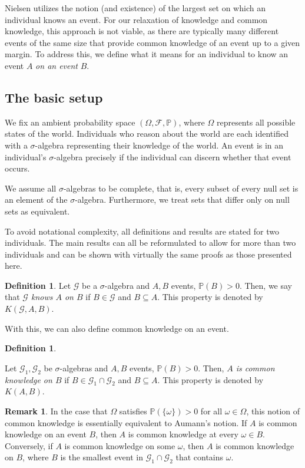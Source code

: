 \documentclass[a4paper, 10pt]{article}
\numberwithin{theorem}{section}
\theoremstyle{definition}
\newtheorem{definition}[theorem]{Definition}
\newtheorem{remark}[theorem]{Remark}
\newcommand{\F}{\mathcal{F}}
\newcommand{\G}{\mathcal{G}}
\renewcommand{\P}{\mathbb{P}}
\begin{document}
Nielsen utilizes the notion (and existence) of the largest set on which an individual knows an event. For our relaxation of knowledge and common knowledge, this approach is not viable, as there are typically many different events of the same size that provide common knowledge of an event up to a given margin. To address this, we define what it means for an individual to know an event $A$ \emph{on an event} $B$.

\subsection{The basic setup}

We fix an ambient probability space $(\Omega, \F, \P)$, where $\Omega$ represents all possible states of the world. Individuals who reason about the world are each identified with a $\sigma$-algebra representing their knowledge of the world. An event is in an individual's $\sigma$-algebra precisely if the individual can discern whether that event occurs. 

We assume all $\sigma$-algebras to be complete, that is, every subset of every null set is an element of the $\sigma$-algebra. Furthermore, we treat sets that differ only on null sets as equivalent.

To avoid notational complexity, all definitions and results are stated for two individuals. The main results can all be reformulated to allow for more than two individuals and can be shown with virtually the same proofs as those presented here.

\begin{definition}\label{def:knowledge_on_B}
	Let $\G$ be a $\sigma$-algebra  and $A, B$  events, $\P(B)>0$. Then, we say that \emph{$\G$ knows $A$ on $B$} if $B \in \G$ and $B \subseteq A$. This property is denoted by $K(\G,A,B)$.
\end{definition}
With this, we can also define common knowledge on an event.

\begin{definition}\label{def:cn}

	Let $\G_1, \G_2$ be $\sigma$-algebras and $A, B$ events, $\P(B)>0$. Then, \emph{$A$ is common knowledge on $B$} if $B \in \G_1\cap \G_2$ and $B \subseteq A$. This property is denoted by $K(A,B).$ 

\end{definition}

\begin{remark}
	In the case that $\Omega$ satisfies $\P(\{ \omega \})>0$ for all $\omega \in \Omega$, this notion of common knowledge is essentially equivalent to Aumann's notion. If $A$ is common knowledge on an event $B$, then $A$ is common knowledge at every $\omega \in B$. Conversely, if $A$ is common knowledge on some $\omega$, then $A$ is common knowledge on $B$, where $B$ is the smallest event in $\G_1 \cap \G_2$ that contains $\omega$. 
\end{remark}
\end{document}
